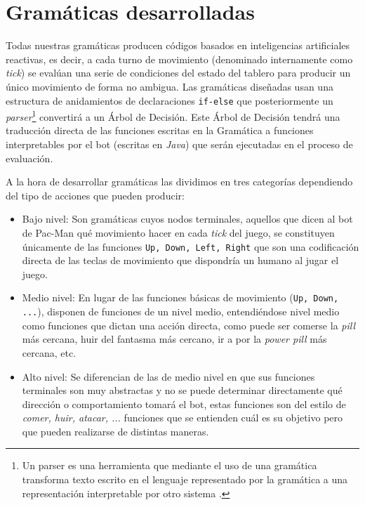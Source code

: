 \section{Gramáticas desarrolladas}
Todas nuestras gramáticas producen códigos basados en inteligencias artificiales reactivas, es decir, a cada turno de movimiento (denominado internamente como \textit{tick}) se evalúan una serie de condiciones del estado del tablero para producir un único movimiento de forma no ambigua. Las gramáticas diseñadas usan una estructura de anidamientos de declaraciones \texttt{if-else} que posteriormente un \textit{parser}\footnote{Un parser es una herramienta que mediante el uso de una gramática transforma texto escrito en el lenguaje representado por la gramática a una representación interpretable por otro sistema \cite{parserTechopedia}.
} convertirá a un Árbol de Decisión. Este Árbol de Decisión tendrá una traducción directa de las funciones escritas en la Gramática a funciones interpretables por el bot (escritas en \textit{Java}) que serán ejecutadas en el proceso de evaluación.
 
A la hora de desarrollar gramáticas las dividimos en tres categorías dependiendo del tipo de acciones que pueden producir:
\begin{itemize}
\item Bajo nivel: Son gramáticas cuyos nodos terminales, aquellos que dicen al bot de Pac-Man qué movimiento hacer en cada \textit{tick} del juego, se constituyen únicamente de las funciones \texttt{Up, Down, Left, Right} que son una codificación directa de las teclas de movimiento que dispondría un humano al jugar el juego.

\item Medio nivel: En lugar de las funciones básicas de movimiento (\texttt{Up, Down, ...}), disponen de funciones de un nivel medio,  entendiéndose nivel medio como funciones que dictan una acción directa, como puede ser comerse la \textit{pill} más cercana, huir del fantasma más cercano, ir a por la \textit{power pill} más cercana, etc.

\item Alto nivel: Se diferencian de las de medio nivel en que sus funciones terminales son muy abstractas y no se puede determinar directamente qué dirección o comportamiento tomará el bot, estas funciones son del estilo de \textit{comer, huir, atacar, ...} funciones que se entienden cuál es su objetivo pero que pueden realizarse de distintas maneras.
\end{itemize}

